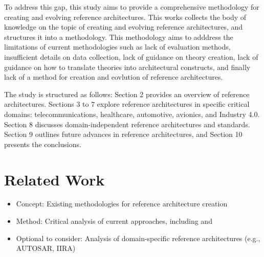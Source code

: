 \documentclass[12pt,a4paper]{article}
\begin{document}
To address this gap, this study aims to provide a comprehensive methodology for creating and evolving reference architectures. This works collects the body of knowledge on the topic of creating and evolving reference architectures, and structures it into a methodology. This methodology aims to adddress the limitations of current methodologies such as lack of evaluation methods, insufficient details on data collection, lack of guidance on theory creation, lack of guidance on how to translate theories into architectural constructs, and finally lack of a method for creation and eovlution of reference architectures. 




The study is structured as follows: Section 2 provides an overview of reference architectures. Sections 3 to 7 explore reference architectures in specific critical domains: telecommunications, healthcare, automotive, avionics, and Industry 4.0. Section 8 discusses domain-independent reference architectures and standards. Section 9 outlines future advances in reference architectures, and Section 10 presents the conclusions.

\section{Related Work}
\begin{itemize}
    \item Concept: Existing methodologies for reference architecture creation
    \item Method: Critical analysis of current approaches, including \citet{Galster2011} and \citet{Nakagawa2014}
    \item Optional to consider: Analysis of domain-specific reference architectures (e.g., AUTOSAR, IIRA) \citep{Nakagawa2023}
\end{itemize}
\end{document}
